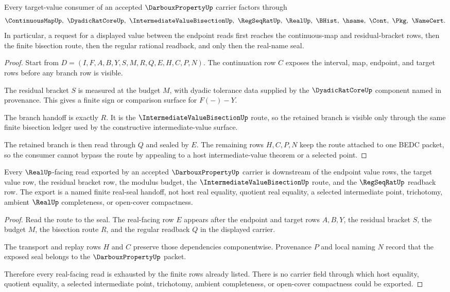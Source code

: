 \begin{theorem}
\label{thm:darboux-property-ivt-route}
Every target-value consumer of an accepted $\DarbouxPropertyUp$ carrier factors through
$$
\ContinuousMapUp,\ \DyadicRatCoreUp,\ \IntermediateValueBisectionUp,\ \RegSeqRatUp,\ \RealUp,\ \BHist,\ \hsame,\ \Cont,\ \Pkg,\ \NameCert .
$$
In particular, a request for a displayed value between the endpoint reads first reaches the continuous-map and residual-bracket rows, then the finite bisection route, then the regular rational readback, and only then the real-name seal.
\end{theorem}
\begin{proof}
Start from $D=(I,F,A,B,Y,S,M,R,Q,E,H,C,P,N)$. The continuation row $C$ exposes the interval, map, endpoint, and target rows before any branch row is visible.

The residual bracket $S$ is measured at the budget $M$, with dyadic tolerance data supplied by the $\DyadicRatCoreUp$ component named in provenance. This gives a finite sign or comparison surface for $F(-)-Y$.

The branch handoff is exactly $R$. It is the $\IntermediateValueBisectionUp$ route, so the retained branch is visible only through the same finite bisection ledger used by the constructive intermediate-value surface.

The retained branch is then read through $Q$ and sealed by $E$. The remaining rows $H,C,P,N$ keep the route attached to one BEDC packet, so the consumer cannot bypass the route by appealing to a host intermediate-value theorem or a selected point.
\end{proof}

\begin{theorem}
\label{thm:darboux-property-real-seal-nonescape}
Every $\RealUp$-facing read exported by an accepted $\DarbouxPropertyUp$ carrier is downstream of the endpoint value rows, the target value row, the residual bracket row, the modulus budget, the $\IntermediateValueBisectionUp$ route, and the $\RegSeqRatUp$ readback row. The export is a named finite real-seal handoff, not host real equality, quotient real equality, a selected intermediate point, trichotomy, ambient $\RealUp$ completeness, or open-cover compactness.
\end{theorem}
\begin{proof}
Read the route to the seal. The real-facing row $E$ appears after the endpoint and target rows $A,B,Y$, the residual bracket $S$, the budget $M$, the bisection route $R$, and the regular readback $Q$ in the displayed carrier.

The transport and replay rows $H$ and $C$ preserve those dependencies componentwise. Provenance $P$ and local naming $N$ record that the exposed seal belongs to the $\DarbouxPropertyUp$ packet.

Therefore every real-facing read is exhausted by the finite rows already listed. There is no carrier field through which host equality, quotient equality, a selected intermediate point, trichotomy, ambient completeness, or open-cover compactness could be exported.
\end{proof}


